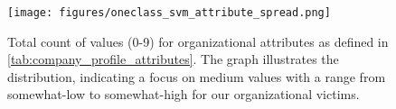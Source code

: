 \begin{figure}
  \captionsetup{
    belowskip=-8pt,
  }
  \centering
  \texttt{[image: figures/oneclass\_svm\_attribute\_spread.png]}%
\caption[Dataset Records Attribute Count]{
Total count of values (0-9) for organizational attributes as defined in \ref{tab:company_profile_attributes}. The graph illustrates the distribution, indicating a focus on medium values with a range from somewhat-low to somewhat-high for our organizational victims.}
  \label{fig:attribute_spread}
\end{figure}